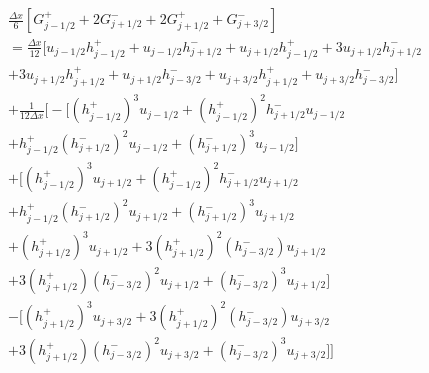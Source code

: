 \documentclass[12pt]{article}
\begin{document}
 \begin{multline}
\frac{\Delta x}{6}  \left[G^+_{j- 1/2} +  2G^-_{j+ 1/2} +  2G^+_{j+ 1/2}  +  G^-_{j+ 3/2}\right] \\ = \frac{\Delta x}{12} \bigg[ u_{j- 1/2}h^+_{j- 1/2} + u_{j- 1/2}h^-_{j+ 1/2}
+  u_{j+1/2}h^+_{j- 1/2} + 3u_{j+1/2}h^-_{j+ 1/2} \\ + 3u_{j+1/2} h^+_{j+ 1/2}  + u_{j+1/2} h^-_{j- 3/2}
+u_{j+ 3/2}h^+_{j+ 1/2} + u_{j+ 3/2}h^-_{j- 3/2} \bigg]
\\ +  \frac{1}{12\Delta x} \bigg[ -\bigg[ \left(h^+_{j- 1/2}\right)^3u_{j- 1/2} + \left(h^+_{j- 1/2}\right)^2h^-_{j+ 1/2} u_{j- 1/2} \\ + h^+_{j- 1/2}\left(h^-_{j+ 1/2}\right)^2u_{j- 1/2} +\left(h^-_{j+ 1/2}\right)^3u_{j- 1/2} \bigg] \\+\bigg[\left(h^+_{j- 1/2}\right)^3u_{j+1/2}  + \left(h^+_{j- 1/2}\right)^2h^-_{j+ 1/2} u_{j+1/2}  \\ + h^+_{j- 1/2}\left(h^-_{j+ 1/2}\right)^2 u_{j+1/2} + \left(h^-_{j+ 1/2}\right)^3  u_{j+1/2} \\ +\left(h^+_{j+ 1/2}\right)^3u_{j+1/2} + 3\left(h^+_{j+ 1/2}\right)^2\left(h^-_{j- 3/2}\right)u_{j+1/2} \\ + 3\left(h^+_{j+ 1/2}\right) \left(h^-_{j- 3/2}\right)^2u_{j+1/2}  +\left(h^-_{j- 3/2}\right)^3  u_{j+1/2}  \bigg] \\-\bigg[\left(h^+_{j+ 1/2}\right)^3u_{j+3/2} + 3\left(h^+_{j+ 1/2}\right)^2\left(h^-_{j- 3/2}\right)u_{j+3/2} \\ + 3\left(h^+_{j+ 1/2}\right) \left(h^-_{j- 3/2}\right)^2u_{j+3/2}  +\left(h^-_{j- 3/2}\right)^3  u_{j+3/2}  \bigg]   \bigg]
 \end{multline}
 
\end{document}
